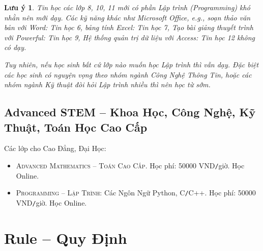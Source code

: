 \documentclass{article}
\numberwithin{equation}{section}
\newtheorem{luuy}{Lưu ý}[section]
\begin{document}
\begin{luuy}
	Tin học các lớp 8, 10, 11 mới có phần Lập trình (Programming) khó nhằn nên mới dạy. Các kỹ năng khác như Microsoft Office, e.g., soạn thảo văn bản với Word: Tin học 6, bảng tính Excel: Tin học 7, Tạo bài giảng thuyết trình với Powerful: Tin học 9, Hệ thống quản trị dữ liệu với Access: Tin học 12 không có dạy.
	
	Tuy nhiên, nếu học sinh bất cứ lớp nào muốn học Lập trình thì vẫn dạy. Đặc biệt các học sinh có nguyện vọng theo nhóm ngành Công Nghệ Thông Tin, hoặc các nhóm ngành Kỹ thuật đòi hỏi Lập trình nhiều thì nên học từ sớm.
\end{luuy}

\subsection{Advanced STEM -- Khoa Học, Công Nghệ, Kỹ Thuật, Toán Học Cao Cấp}
Các lớp cho Cao Đẳng, Đại Học:
\begin{itemize}
	\item \textsc{Advanced Mathematics -- Toán Cao Cấp}. {\sf Học phí:} 50000 VND{\tt/}giờ. Học Online.
	\item \textsc{Programming -- Lập Trình}: Các Ngôn Ngữ Python, C{\tt/}C++. {\sf Học phí:} 50000 VND{\tt/}giờ. Học Online.
\end{itemize}


\section{Rule -- Quy Định}
\end{document}
